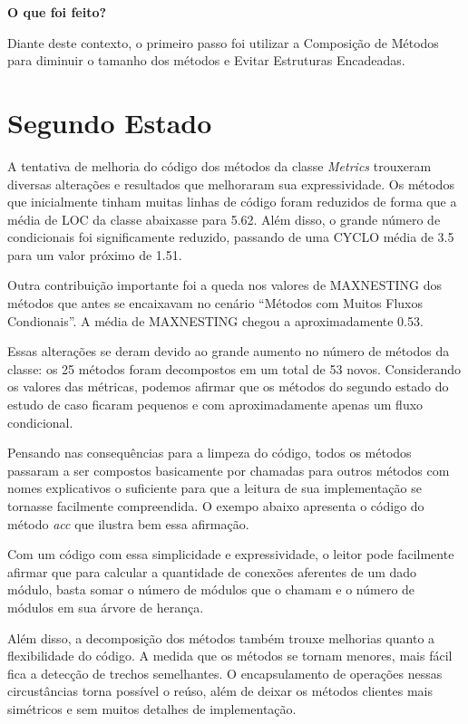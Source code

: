 \vskip 1.0cm
\textbf{O que foi feito?}

Diante deste contexto, o primeiro passo foi utilizar a Composição de Métodos para
diminuir o tamanho dos métodos e Evitar Estruturas Encadeadas.

\section{Segundo Estado}

A tentativa de melhoria do código dos métodos da classe \textit{Metrics}
trouxeram diversas alterações e resultados que melhoraram sua expressividade.
Os métodos que inicialmente tinham muitas linhas de código foram reduzidos de forma
que a média de LOC da classe abaixasse para 5.62. Além disso, o grande número de condicionais foi
significamente reduzido, passando de uma CYCLO média de 3.5 para um valor próximo de 1.51. 

Outra contribuição importante foi a queda nos valores de MAXNESTING dos métodos
que antes se encaixavam no cenário ``Métodos com Muitos Fluxos Condionais''. A média de
MAXNESTING chegou a aproximadamente 0.53.

Essas alterações se deram devido ao grande aumento no número de métodos da classe:
os 25 métodos foram decompostos em um total de 53 novos. Considerando os valores
das métricas, podemos afirmar que os métodos do segundo estado do estudo de caso
ficaram pequenos e com aproximadamente apenas um fluxo condicional.

Pensando nas consequências para a limpeza do código, todos os métodos passaram
a ser compostos basicamente por chamadas para outros métodos com nomes explicativos
o suficiente para que a leitura de sua implementação se tornasse facilmente compreendida.
O exempo abaixo apresenta o código do método \textit{acc} que ilustra bem essa afirmação.



Com um código com essa simplicidade e expressividade, o leitor pode facilmente
afirmar que para calcular a quantidade de conexões aferentes de um dado módulo, basta
somar o número de módulos que o chamam e o número de módulos em sua árvore de herança.

Além disso, a decomposição dos métodos também trouxe melhorias quanto a flexibilidade
do código. A medida que os métodos se tornam menores, mais fácil fica a detecção de
trechos semelhantes. O encapsulamento de operações nessas circustâncias torna possível
o reúso, além de deixar os métodos clientes mais simétricos e sem muitos detalhes de implementação.


